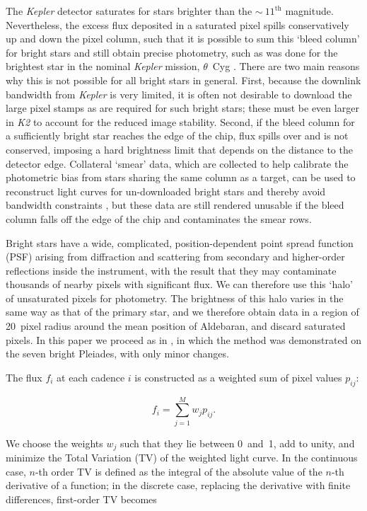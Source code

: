 \documentclass[modern]{aastex61}
\newcommand{\kepler}{\emph{Kepler}\xspace}
\newcommand{\ktwo}{\emph{K2}\xspace}
\begin{document}
The \kepler detector saturates for stars brighter than the $\sim~11^\text{th}$ magnitude. Nevertheless, the excess flux deposited in a saturated pixel spills conservatively up and down the pixel column, such that it is possible to sum this `bleed column' for bright stars and still obtain precise photometry, such as was done for the brightest star in the nominal \kepler mission, $\theta$~Cyg \citep[$V = 4.48$;][]{guzik2011,thetacygwhite,guzik2016}. There are two main reasons why this is not possible for all bright stars in general. First, because the downlink bandwidth from \kepler is very limited, it is often not desirable to download the large pixel stamps as are required for such bright stars; these must be even larger in \ktwo to account for the reduced image stability. Second, if the bleed column for a sufficiently bright star reaches the edge of the chip, flux spills over and is not conserved, imposing a hard brightness limit that depends on the distance to the detector edge. 
Collateral `smear' data, which are collected to help calibrate the photometric bias from stars sharing the same column as a target, can be used to reconstruct light curves for un-downloaded bright stars and thereby avoid bandwidth constraints \citep{k2smear}, but these data are still rendered unusable if the bleed column falls off the edge of the chip and contaminates the smear rows.

Bright stars have a wide, complicated, position-dependent point spread function (PSF) arising from diffraction and scattering from secondary and higher-order reflections inside the instrument, with the result that they may contaminate thousands of nearby pixels with significant flux. We can therefore use this `halo' of unsaturated pixels for photometry. The brightness of this halo varies in the same way as that of the primary star, and we therefore obtain data in a region of 20~pixel radius around the mean position of Aldebaran, and discard saturated pixels.
In this paper we proceed as in \citet{White2017}, in which the method was demonstrated on the seven bright Pleiades, with only minor changes.

The flux $f_i$ at each cadence $i$ is constructed as a weighted sum of pixel values $p_{ij}$:

\begin{equation}
	f_i = \sum_{j=1}^{M} w_j p_{ij}.
\end{equation}

\noindent We choose the weights $w_j$ such that they lie between 0~and~1, add to unity, and minimize the Total Variation (TV) of the weighted light curve. In the continuous case, $n$-th order TV is defined as the integral of the absolute value of the $n$-th derivative of a function; in the discrete case, replacing the derivative with finite differences, first-order TV becomes
\end{document}
